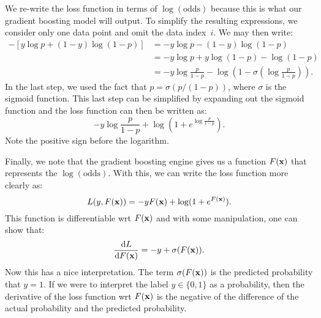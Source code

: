 We re-write the loss function in terms of $\log (\text{odds})$ because this 
is what our gradient boosting model will output. To simplify the resulting 
expressions, we consider only one data point and omit the data index~$i$. 
We may then write:
\begin{align*}
    - \left [ y \log p + (1 - y) \log (1 - p) \right ] 
        & = - y \log p - (1 - y) \log (1 - p) \\
        & = - y \log p + y \log (1 - p) - \log (1 - p) \\
        & = - y \log \frac{p}{1 - p} - 
                \log \left (1 - \sigma \left ( \log \frac{p}{1 - p} \right ) \right ).
\end{align*}
In the last step, we used the fact that $p = \sigma (p / (1 - p))$, where $\sigma$
is the sigmoid function. This last step can be simplified by expanding out the 
sigmoid function and the loss function can then be written as:
\begin{equation}
    - y \log \frac{p}{1 - p} + \log (1 + e^{\log \frac{p}{1 - p}}).
\end{equation}
Note the positive sign before the logarithm. 

Finally, we note that the gradient 
boosting engine gives us a function $F(\mathbf{x})$ that represents the 
$\log (\text{odds})$. With this, we can write the loss function more clearly as:
\begin{equation}
    L(y, F(\mathbf{x})) = -y F(\mathbf{x}) + \log (1 + e^{F(\mathbf{x})}).
\end{equation}
This function is differentiable wrt $F(\mathbf{x})$ and with some manipulation, 
one can show that:
\begin{equation}
    \frac{\mathrm{d} L}{\mathrm{d} F(\mathbf{x})} = - y + \sigma (F(\mathbf{x})). 
\end{equation}
Now this has a nice interpretation. The term $\sigma (F(\mathbf{x}))$ is the 
predicted probability that $y = 1$. If we were to interpret the label 
$y \in \{0, 1\}$ as a probability, then the derivative of the loss function 
wrt $F(\mathbf{x})$ is the negative of the difference of the actual probability 
and the predicted probability. 

